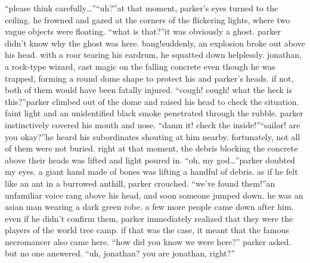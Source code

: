 “please think carefully…”“uh?”at that moment, parker’s eyes turned to the ceiling.
 he frowned and gazed at the corners of the flickering lights, where two vague objects were floating.
“what is that?”it was obviously a ghost.
 parker didn’t know why the ghost was here.
bang!suddenly, an explosion broke out above his head.
 with a roar tearing his eardrum, he squatted down helplessly.
jonathan, a rock-type wizard, cast magic on the falling concrete even though he was trapped, forming a round dome shape to protect his and parker’s heads.
 if not, both of them would have been fatally injured.
“cough! cough! what the heck is this?”parker climbed out of the dome and raised his head to check the situation.
faint light and an unidentified black smoke penetrated through the rubble.
parker instinctively covered his mouth and nose.
“damn it! check the inside!”“sailor! are you okay?”he heard his subordinates shouting at him nearby.
 fortunately, not all of them were not buried.
right at that moment, the debris blocking the concrete above their heads was lifted and light poured in.
“oh, my god…”parker doubted my eyes.
a giant hand made of bones was lifting a handful of debris.
 as if he felt like an ant in a burrowed anthill, parker crouched.
“we’ve found them!”an unfamiliar voice rang above his head, and soon someone jumped down.
he was an asian man wearing a dark green robe.
 a few more people came down after him.
even if he didn’t confirm them, parker immediately realized that they were the players of the world tree camp.
 if that was the case, it meant that the famous necromancer also came here.
“how did you know we were here?” parker asked.
but no one answered.
“uh, jonathan? you are jonathan, right?”

